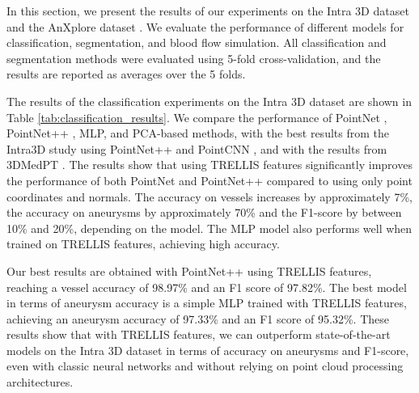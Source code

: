 \documentclass[%
 reprint,
 amsmath,amssymb,
 aps,
 floatfix,
 nofootinbib,
]{revtex4-2}
\begin{document}
In this section, we present the results of our experiments on the Intra 3D dataset \citep{yang2020intra} and the AnXplore dataset \citep{anxplore}. We evaluate the performance of different models for classification, segmentation, and blood flow simulation. All classification and segmentation methods were evaluated using 5-fold cross-validation, and the results are reported as averages over the 5 folds.

The results of the classification experiments on the Intra 3D dataset \citep{yang2020intra} are shown in Table \ref{tab:classification_results}. We compare the performance of PointNet \citep{pointnet}, PointNet++ \citep{pointnetpp}, MLP, and PCA-based methods, with the best results from the Intra3D study \citep{yang2020intra} using PointNet++ \citep{pointnet} and PointCNN \citep{pointcnn}, and with the results from 3DMedPT \citep{yu20213dmedicalpointtransformer}. The results show that using TRELLIS features significantly improves the performance of both PointNet and PointNet++ compared to using only point coordinates and normals. The accuracy on vessels increases by approximately 7\%, the accuracy on aneurysms by approximately 70\% and the F1-score by between 10\% and 20\%, depending on the model. The MLP model also performs well when trained on TRELLIS features, achieving high accuracy.

Our best results are obtained with PointNet++ using TRELLIS features, reaching a vessel accuracy of 98.97\% and an F1 score of 97.82\%. The best model in terms of aneurysm accuracy is a simple MLP trained with TRELLIS features, achieving an aneurysm accuracy of 97.33\% and an F1 score of 95.32\%. These results show that with TRELLIS features, we can outperform state-of-the-art models on the Intra 3D dataset \citep{yang2020intra} in terms of accuracy on aneurysms and F1-score, even with classic neural networks and without relying on point cloud processing architectures.
\end{document}

